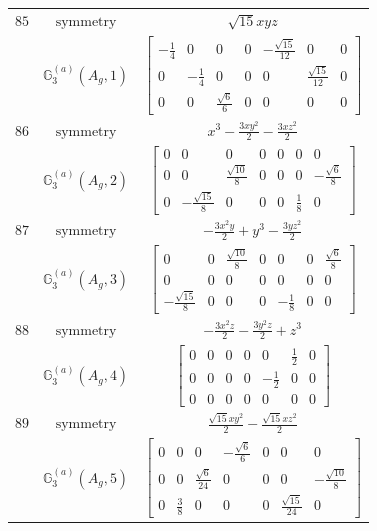 \documentclass[fleqn,8pt,landscape]{jsarticle}
\begin{document}
\begin{longtable}{ccc}
$ 85 $ & $ \text{symmetry} $ & $ \sqrt{15} x y z $ \\
$  $ & $ \mathbb{G}_{3}^{(a)}(A_{g},1) $ & $ \begin{bmatrix} - \frac{1}{4} & 0 & 0 & 0 & - \frac{\sqrt{15}}{12} & 0 & 0 \\ 0 & - \frac{1}{4} & 0 & 0 & 0 & \frac{\sqrt{15}}{12} & 0 \\ 0 & 0 & \frac{\sqrt{6}}{6} & 0 & 0 & 0 & 0 \end{bmatrix} $ \\ \hline
$ 86 $ & $ \text{symmetry} $ & $ x^{3} - \frac{3 x y^{2}}{2} - \frac{3 x z^{2}}{2} $ \\
$  $ & $ \mathbb{G}_{3}^{(a)}(A_{g},2) $ & $ \begin{bmatrix} 0 & 0 & 0 & 0 & 0 & 0 & 0 \\ 0 & 0 & \frac{\sqrt{10}}{8} & 0 & 0 & 0 & - \frac{\sqrt{6}}{8} \\ 0 & - \frac{\sqrt{15}}{8} & 0 & 0 & 0 & \frac{1}{8} & 0 \end{bmatrix} $ \\ \hline
$ 87 $ & $ \text{symmetry} $ & $ - \frac{3 x^{2} y}{2} + y^{3} - \frac{3 y z^{2}}{2} $ \\
$  $ & $ \mathbb{G}_{3}^{(a)}(A_{g},3) $ & $ \begin{bmatrix} 0 & 0 & \frac{\sqrt{10}}{8} & 0 & 0 & 0 & \frac{\sqrt{6}}{8} \\ 0 & 0 & 0 & 0 & 0 & 0 & 0 \\ - \frac{\sqrt{15}}{8} & 0 & 0 & 0 & - \frac{1}{8} & 0 & 0 \end{bmatrix} $ \\ \hline
$ 88 $ & $ \text{symmetry} $ & $ - \frac{3 x^{2} z}{2} - \frac{3 y^{2} z}{2} + z^{3} $ \\
$  $ & $ \mathbb{G}_{3}^{(a)}(A_{g},4) $ & $ \begin{bmatrix} 0 & 0 & 0 & 0 & 0 & \frac{1}{2} & 0 \\ 0 & 0 & 0 & 0 & - \frac{1}{2} & 0 & 0 \\ 0 & 0 & 0 & 0 & 0 & 0 & 0 \end{bmatrix} $ \\ \hline
$ 89 $ & $ \text{symmetry} $ & $ \frac{\sqrt{15} x y^{2}}{2} - \frac{\sqrt{15} x z^{2}}{2} $ \\
$  $ & $ \mathbb{G}_{3}^{(a)}(A_{g},5) $ & $ \begin{bmatrix} 0 & 0 & 0 & - \frac{\sqrt{6}}{6} & 0 & 0 & 0 \\ 0 & 0 & \frac{\sqrt{6}}{24} & 0 & 0 & 0 & - \frac{\sqrt{10}}{8} \\ 0 & \frac{3}{8} & 0 & 0 & 0 & \frac{\sqrt{15}}{24} & 0 \end{bmatrix} $ \\ \hline

\end{longtable}
\end{document}
